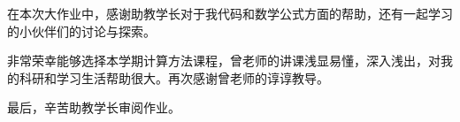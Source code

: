 
\begin{acknowledgements}
	在本次大作业中，感谢助教学长对于我代码和数学公式方面的帮助，还有一起学习的小伙伴们的讨论与探索。

	非常荣幸能够选择本学期计算方法课程，曾老师的讲课浅显易懂，深入浅出，对我的科研和学习生活帮助很大。再次感谢曾老师的谆谆教导。

	最后，辛苦助教学长审阅作业。
\end{acknowledgements}
